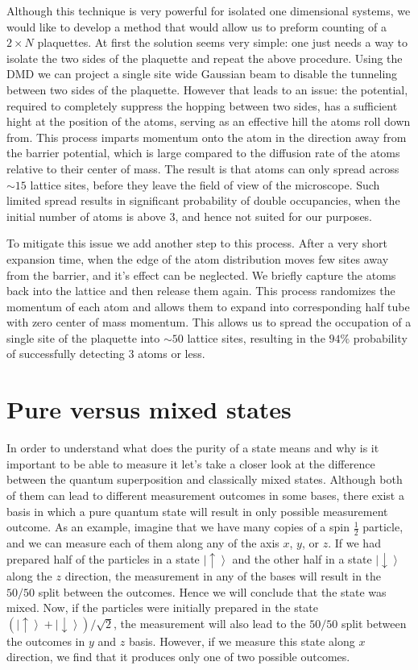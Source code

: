  Although this technique is very powerful for isolated one dimensional systems, we would like to develop a method that would allow us to preform counting of a $2\times N$ plaquettes. At first the solution seems very simple: one just needs a way to isolate the two sides of the plaquette and repeat the above procedure. Using the DMD we can project a single site wide Gaussian beam to disable the tunneling between two sides of the plaquette. However that leads to an issue: the potential, required to completely suppress the hopping between two sides, has a sufficient hight at the position of the atoms, serving as an effective hill the atoms roll down from. This process imparts momentum onto the atom in the direction away from the barrier potential, which is large compared to the diffusion rate of the atoms relative to their center of mass. The result is that atoms can only spread across $\sim 15$ lattice sites, before they leave the field of view of the microscope. Such limited spread results in significant probability of double occupancies, when the initial number of atoms is above $3$, and hence not suited for our purposes.
 
 To mitigate this issue we add another step to this process. After a very short expansion time, when the edge of the atom distribution moves few sites away from the barrier, and it's effect can be neglected. We briefly capture the atoms back into the lattice and then release them again. This process randomizes the momentum of each atom and allows them to expand into corresponding half tube with zero center of mass momentum. This allows us to spread the occupation of a single site of the plaquette into $\sim 50$ lattice sites, resulting in the $94\%$ probability of successfully detecting $3$ atoms or less.
 
  \section{Pure versus mixed states}
In order to understand what does the purity of a state means and why is it important to be able to measure it let's take a closer look at the difference between the quantum superposition and classically mixed states. Although both of them can lead to different measurement outcomes in some bases, there exist a basis in which a pure quantum state will result in only possible measurement outcome. As an example, imagine that we have many copies of a spin $\frac{1}{2}$ particle, and we can  measure each of them along any of the axis $x$, $y$, or $z$. If we had prepared half of the particles in a state $\left| \uparrow \right>$ and the other half in a state $\left| \downarrow \right>$ along the $z$ direction, the measurement in any of the bases will result in the $50/50$ split between the outcomes. Hence we will conclude that the state was mixed. Now, if the particles were initially prepared in the state $(\left| \uparrow  \right>+ \left| \downarrow  \right>)/\sqrt{2}$, the measurement will also lead to the $50/50$ split between the outcomes in $y$ and $z$ basis. However, if we measure this state along $x$ direction, we find that it produces only one of two possible outcomes. 
 
